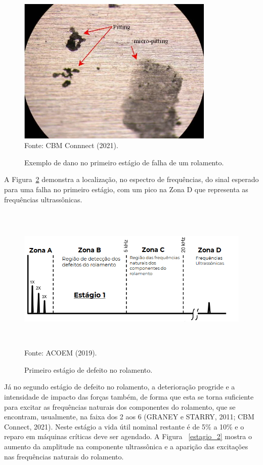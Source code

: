 \documentclass[
	12pt,				
	oneside,			
	a4paper,			
	english,			
	brazil,	
	sumario=abnt-6027-2012		
	]{abntex2ppgsi}
\begin{document}
\begin{figure}[H]
\centering
\caption {Exemplo de dano no primeiro estágio de falha de um rolamento.}
\includegraphics[width=\textwidth,height=70mm,keepaspectratio]{pitting_pista_externa} \\
Fonte: CBM Connnect (2021).
\label{pitting_pista_externa}
\end{figure}

A Figura~\ref{estagio_1} demonstra a localização, no espectro de frequências, do sinal esperado para uma falha no primeiro estágio, com um pico na Zona D que representa as frequências ultrassônicas.  

\begin{figure}[H]
\centering
\caption {Primeiro estágio de defeito no rolamento.}
\includegraphics[width=\textwidth,height=70mm,keepaspectratio]{estagio_1} \\
Fonte: ACOEM (2019).
\label{estagio_1}
\end{figure}

Já no segundo estágio de defeito no rolamento, a deterioração progride e a intensidade de impacto das forças também, de forma que esta se torna suficiente para excitar as frequências naturais dos componentes do rolamento, que se encontram, usualmente, na faixa dos \SI{2}{\kilo{\hertz}} aos \SI{6}{\kilo{\hertz}} (GRANEY e STARRY, 2011; CBM Connect, 2021). Neste estágio a vida útil nominal restante é de 5\% a 10\% e o reparo em máquinas críticas deve ser agendado. A Figura ~\ref{estagio_2} mostra o aumento da amplitude na componente ultrassônica e a aparição das excitações nas frequências naturais do rolamento. 
\end{document}
